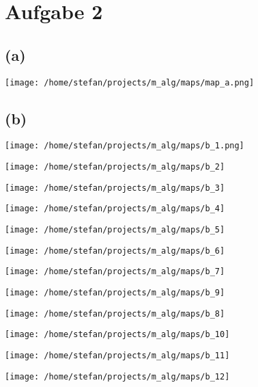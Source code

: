 \documentclass[a4paper]{scrartcl}
\begin{document}
	
	
	
	
	
	
	
	
	
	
	
	
	
	
	
	
	
	
	
	
	
	
	
	
	
	
	
	
	
	
	\section*{Aufgabe 2}
	\subsection*{(a)}
	
	\texttt{[image: /home/stefan/projects/m\_alg/maps/map\_a.png]}
	
	\subsection*{(b)}
	\texttt{[image: /home/stefan/projects/m\_alg/maps/b\_1.png]}
	
	
	\texttt{[image: /home/stefan/projects/m\_alg/maps/b\_2]}
	
	
	\texttt{[image: /home/stefan/projects/m\_alg/maps/b\_3]}
	
	
	\texttt{[image: /home/stefan/projects/m\_alg/maps/b\_4]}
	
	\texttt{[image: /home/stefan/projects/m\_alg/maps/b\_5]}
	
	
	\texttt{[image: /home/stefan/projects/m\_alg/maps/b\_6]}
	
	
	\texttt{[image: /home/stefan/projects/m\_alg/maps/b\_7]}
	
	
	\texttt{[image: /home/stefan/projects/m\_alg/maps/b\_9]}
	
	\texttt{[image: /home/stefan/projects/m\_alg/maps/b\_8]}
	
	\texttt{[image: /home/stefan/projects/m\_alg/maps/b\_10]}
	
	\texttt{[image: /home/stefan/projects/m\_alg/maps/b\_11]}
	
	\texttt{[image: /home/stefan/projects/m\_alg/maps/b\_12]}
	
\end{document}
